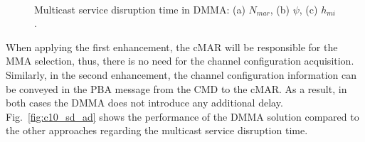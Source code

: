 \begin{figure}[h!]
\centering
{}
\,
\caption[Multicast service disruption time in DMMA.]{Multicast service disruption time in DMMA: (a) $N_{mar}$, (b) $\psi$, (c) $h_{mi}$.}
\label{fig:c10_ad_all}
\end{figure}
When applying the first enhancement, the cMAR will be responsible for the MMA selection, thus, there is no need for the channel configuration acquisition. Similarly, in the second enhancement, the channel configuration information can be conveyed in the PBA message from the CMD to the cMAR. As a result, in both cases the DMMA does not introduce any additional delay. Fig.~\ref{fig:c10_sd_ad} shows the performance of the DMMA solution compared to the other approaches regarding the multicast service disruption time. 

